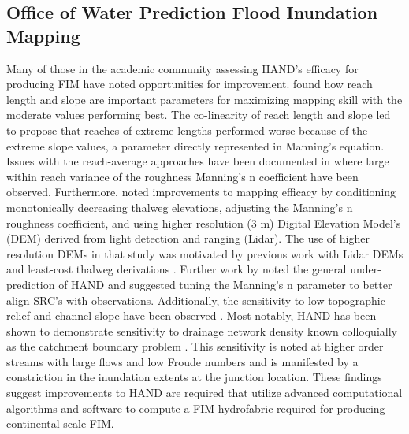 \subsection{Office of Water Prediction Flood Inundation Mapping}
%
Many of those in the academic community assessing HAND's efficacy for producing FIM have noted opportunities for improvement. 
 found how reach length and slope are important parameters for maximizing mapping skill with the moderate values performing best. 
The co-linearity of reach length and slope led  to propose that reaches of extreme lengths performed worse because of the extreme slope values, a parameter directly represented in Manning's equation. 
Issues with the reach-average approaches have been documented in  where large within reach variance of the roughness Manning's n coefficient have been observed.
Furthermore,  noted improvements to mapping efficacy by conditioning monotonically decreasing thalweg elevations, adjusting the Manning's n roughness coefficient, and using higher resolution (3 m) Digital Elevation Model's (DEM) derived from light detection and ranging (Lidar).
The use of higher resolution DEMs in that study was motivated by previous work with Lidar DEMs and least-cost thalweg derivations \cite{zheng2018geoflood}.
Further work by  noted the general under-prediction of HAND and suggested tuning the Manning's n parameter to better align SRC's with observations. 
Additionally, the sensitivity to low topographic relief and channel slope have been observed \cite{johnson2019integrated,godbout2019error}. 
Most notably, HAND has been shown to demonstrate sensitivity to drainage network density known colloquially as the catchment boundary problem \cite{zhang2018comparative,mcgehee2016modified,li2020evaluation,nobre2016hand}.
This sensitivity is noted at higher order streams with large flows and low Froude numbers and is manifested by a constriction in the inundation extents at the junction location.
These findings suggest improvements to HAND are required that utilize advanced computational algorithms and software to compute a FIM hydrofabric required for producing continental-scale FIM.

